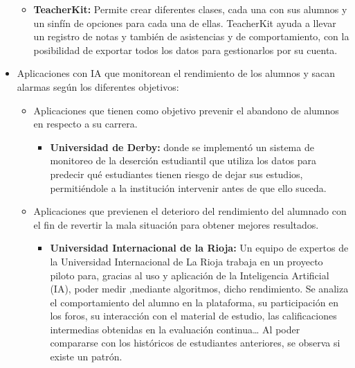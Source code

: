 \begin{itemize}
\begin{itemize}
\item \textbf{TeacherKit:} Permite crear diferentes clases, cada una con sus alumnos y un sinfín de opciones para cada una de ellas. TeacherKit ayuda a llevar un registro de notas y también de asistencias y de comportamiento, con la posibilidad de exportar todos los datos para gestionarlos por su cuenta.
\end{itemize}
\item Aplicaciones con IA que monitorean el rendimiento de los alumnos y sacan alarmas según los diferentes objetivos:
\begin{itemize}
\item Aplicaciones que tienen como objetivo prevenir el abandono de alumnos en respecto a su carrera.
\begin{itemize}
\item \textbf{Universidad de Derby:} donde se implementó un sistema de monitoreo de la deserción estudiantil que utiliza los datos para predecir qué estudiantes tienen riesgo de dejar sus estudios, permitiéndole a la institución intervenir antes de que ello suceda.\cite{riesgoDejarEstudios}
\end{itemize}
\item Aplicaciones que previenen el deterioro del rendimiento del alumnado con el fin de revertir la mala situación para obtener mejores resultados.
\begin{itemize}
\item \textbf{Universidad Internacional de la Rioja:} Un equipo de expertos de la Universidad Internacional de La Rioja trabaja en un proyecto piloto para, gracias al uso y aplicación de la Inteligencia Artificial (IA), poder medir ,mediante algoritmos, dicho rendimiento. Se analiza el comportamiento del alumno en la plataforma, su participación en los foros, su interacción con el material de estudio, las calificaciones intermedias obtenidas en la evaluación continua… Al poder compararse con los históricos de estudiantes anteriores, se observa si existe un patrón.\cite{rendimientoAlumnos}
\end{itemize}
\end{itemize}
\end{itemize}

